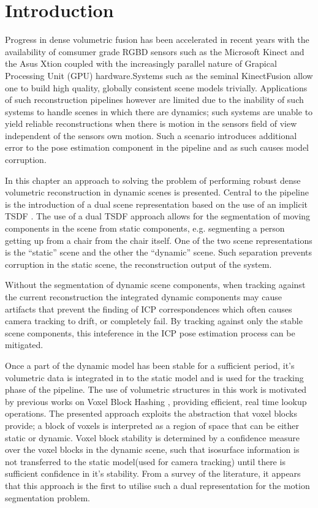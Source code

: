 
\section{Introduction}
\label{sec: moseg_introduction}
Progress in dense volumetric fusion has been accelerated in recent years with
the availability of comsumer grade RGBD sensors such as the Microsoft Kinect and
the Asus Xtion coupled with the increasingly parallel nature of Grapical Processing 
Unit (GPU) hardware.Systems such as the seminal KinectFusion \cite{Newcombe2011} 
allow one to build high quality, globally consistent scene models trivially. 
Applications of such reconstruction pipelines however are limited due to the 
inability of such systems to handle scenes in which there are dynamics; such 
systems are unable to yield reliable reconstructions when there is motion in the 
sensors field of view independent of the sensors own motion. Such a scenario introduces
additional error to the pose estimation component in the pipeline and as such
causes model corruption.

In this chapter an approach to solving the problem of performing robust
dense volumetric reconstruction in dynamic scenes is presented. Central to the
pipeline is the introduction of a dual scene representation based on the use
of an implicit TSDF \cite{Curless1996}. The use of a dual TSDF approach allows
for the segmentation of moving components in the scene from static components,
e.g. segmenting a person getting up from a chair from the chair itself. One of
the two scene representations is the ``static'' scene and the other the
``dynamic'' scene. Such separation prevents corruption in the static scene,
the reconstruction output of the system.

Without the segmentation of dynamic scene components, when tracking against the
current reconstruction the integrated dynamic components may cause artifacts
that prevent the finding of ICP correspondences which often causes camera
tracking to drift, or completely fail. By tracking against only the stable
scene components, this inteference in the ICP pose estimation process can be
mitigated.

Once a part of the dynamic model has been stable for a sufficient period, it's
volumetric data is integrated in to the static model and is used for the
tracking phase of the pipeline. The use of volumetric structures in this work
is motivated by previous works on Voxel Block Hashing \cite{NieBner2013},
providing efficient, real time lookup operations. The presented approach
exploits the abstraction that voxel blocks provide; a block of voxels is
interpreted as a region of space that can be either static or dynamic.
Voxel block stability is determined by a confidence measure over the voxel
blocks in the dynamic scene, such that isosurface information is not transferred
to the static model(used for camera tracking) until there is sufficient
confidence in it's stability. From a survey of the literature, it appears that 
this approach is the first to utilise such a dual representation for the motion 
segmentation problem.

